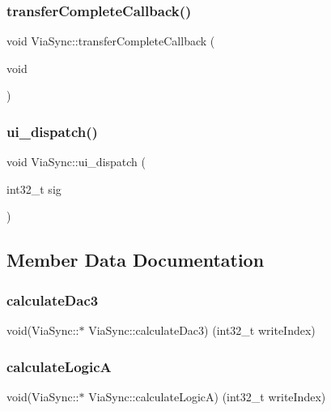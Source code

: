 \subsubsection{\texorpdfstring{transfer\+Complete\+Callback()}{transferCompleteCallback()}}
{\footnotesize\ttfamily void Via\+Sync\+::transfer\+Complete\+Callback (\begin{DoxyParamCaption}\item[{void}]{ }\end{DoxyParamCaption})}

\mbox{\label{class_via_sync_a2b6602ba148dc95dc06f5410e8451b52}} 
\subsubsection{\texorpdfstring{ui\+\_\+dispatch()}{ui\_dispatch()}}
{\footnotesize\ttfamily void Via\+Sync\+::ui\+\_\+dispatch (\begin{DoxyParamCaption}\item[{int32\+\_\+t}]{sig }\end{DoxyParamCaption})\hspace{0.3cm}{\ttfamily [inline]}}



\subsection{Member Data Documentation}
\mbox{\label{class_via_sync_a860a8bb6bf093193a468033192a7b857}} 
\subsubsection{\texorpdfstring{calculate\+Dac3}{calculateDac3}}
{\footnotesize\ttfamily void(Via\+Sync\+::$\ast$ Via\+Sync\+::calculate\+Dac3) (int32\+\_\+t write\+Index)}

\mbox{\label{class_via_sync_a9ee32a34a997a3d8283c9a2abfa7fc4e}} 
\subsubsection{\texorpdfstring{calculate\+LogicA}{calculateLogicA}}
{\footnotesize\ttfamily void(Via\+Sync\+::$\ast$ Via\+Sync\+::calculate\+LogicA) (int32\+\_\+t write\+Index)}


